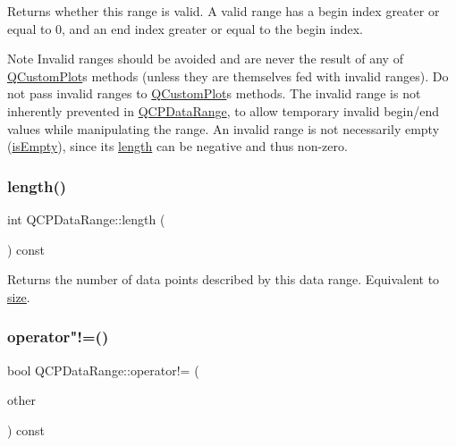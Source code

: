 Returns whether this range is valid. A valid range has a begin index greater or equal to 0, and an end index greater or equal to the begin index.

\begin{DoxyNote}{Note}
Invalid ranges should be avoided and are never the result of any of \hyperlink{class_q_custom_plot}{Q\+Custom\+Plot}\textquotesingle{}s methods (unless they are themselves fed with invalid ranges). Do not pass invalid ranges to \hyperlink{class_q_custom_plot}{Q\+Custom\+Plot}\textquotesingle{}s methods. The invalid range is not inherently prevented in \hyperlink{class_q_c_p_data_range}{Q\+C\+P\+Data\+Range}, to allow temporary invalid begin/end values while manipulating the range. An invalid range is not necessarily empty (\hyperlink{class_q_c_p_data_range_ac32e53fc05d6cd2eac96b96a7265d3b8}{is\+Empty}), since its \hyperlink{class_q_c_p_data_range_a1e7836058f755c6ab9f11996477b7150}{length} can be negative and thus non-\/zero. 
\end{DoxyNote}
\mbox{\label{class_q_c_p_data_range_a1e7836058f755c6ab9f11996477b7150}} 
\subsubsection{\texorpdfstring{length()}{length()}}
{\footnotesize\ttfamily int Q\+C\+P\+Data\+Range\+::length (\begin{DoxyParamCaption}{ }\end{DoxyParamCaption}) const\hspace{0.3cm}{\ttfamily [inline]}}

Returns the number of data points described by this data range. Equivalent to \hyperlink{class_q_c_p_data_range_ac6af055e509d1b691c244954ff1c5887}{size}. \mbox{\label{class_q_c_p_data_range_a5bcc9597731a7455407853ed0585f6ab}} 
\subsubsection{\texorpdfstring{operator"!=()}{operator!=()}}
{\footnotesize\ttfamily bool Q\+C\+P\+Data\+Range\+::operator!= (\begin{DoxyParamCaption}\item[{const \hyperlink{class_q_c_p_data_range}{Q\+C\+P\+Data\+Range} \&}]{other }\end{DoxyParamCaption}) const\hspace{0.3cm}{\ttfamily [inline]}}

